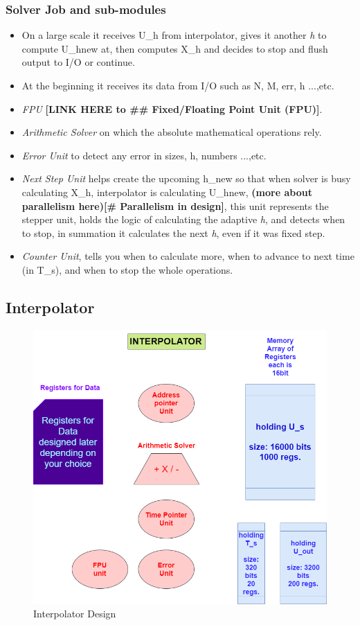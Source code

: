 \documentclass[12pt]{extarticle}
\begin{document}
\subsubsection{Solver Job and sub-modules}
\begin{itemize}
    \item On a large scale it receives U\_h from interpolator, gives it another \emph{h} to compute U\_hnew at, then computes X\_h and decides to stop and flush output to I/O or continue.
    \item At the beginning it receives its data from I/O such as N, M, err, h ...,etc.
    \item \emph{FPU} \textbf{[LINK HERE to \#\# Fixed/Floating Point Unit (FPU)]}.
    \item \emph{Arithmetic Solver} on which the absolute mathematical operations rely.
    \item \emph{Error Unit} to detect any error in sizes, h, numbers ...,etc.
    \item \emph{Next Step Unit} helps create the upcoming h\_new so that when solver is busy calculating X\_h, interpolator is calculating U\_hnew, \textbf{(more about parallelism here)[\# Parallelism in design]}, this unit represents the stepper unit, holds the logic of calculating the adaptive \emph{h}, and detects when to stop, in summation it calculates the next \emph{h}, even if it was fixed step.
    \item \emph{Counter Unit}, tells you when to calculate more, when to advance to next time (in T\_s), and when to stop the whole operations.
\end{itemize}

\subsection{Interpolator}

\begin{figure}[hp]
    \centering
    \includegraphics[width=\textwidth]{interpolator}
    \caption{Interpolator Design}
    \label{fig:interpolator}
\end{figure}
\end{document}
